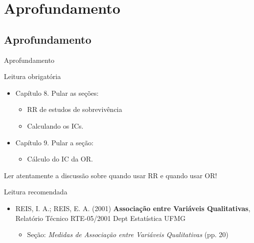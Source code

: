 \documentclass{beamer}
\begin{document}
\section{Aprofundamento}

\subsection{Aprofundamento}

\begin{frame}{\scriptsize Aprofundamento}
  \footnotesize
  \begin{block}{Leitura obrigatória}
    \footnotesize
    \begin{itemize}
      \footnotesize
    \item Capítulo 8. Pular as seções:
      \begin{itemize}
        \scriptsize
      \item RR de estudos de sobrevivência
      \item Calculando os ICs.
      \end{itemize}
    \item Capítulo 9. Pular a seção:
      \begin{itemize}
        \scriptsize
      \item Cálculo do IC da OR.
      \end{itemize}
    \end{itemize}
    \begin{block}{}
      \scriptsize
      \centering
      Ler \alert{atentamente} a discussão sobre quando usar RR e quando usar OR!
    \end{block}
  \end{block}
  \begin{block}{Leitura recomendada}
    \begin{itemize}
    \scriptsize
    \item REIS, I. A.; REIS, E. A. (2001) {\bf Associação entre Variáveis Qualitativas}, Relatório Técnico RTE-05/2001 Dept Estatística UFMG
      \begin{itemize}
        \tiny
      \item Seção: {\em Medidas de Associação entre Variáveis Qualitativas} (pp. 20)
      \end{itemize}
    \end{itemize}
  \end{block}
\end{frame}
\end{document}
